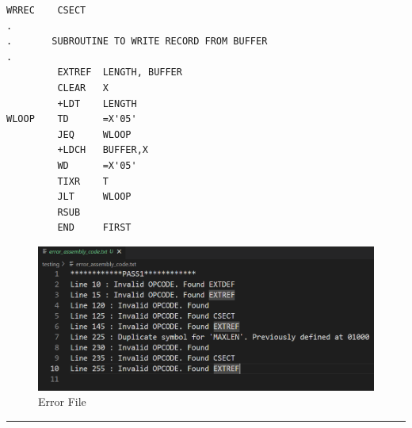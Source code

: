 \documentclass[
]{article}
\begin{document}
\begin{enumerate}
\begin{verbatim}
WRREC    CSECT
.
.       SUBROUTINE TO WRITE RECORD FROM BUFFER
.
         EXTREF  LENGTH, BUFFER
         CLEAR   X            
         +LDT    LENGTH
WLOOP    TD      =X'05'       
         JEQ     WLOOP           
         +LDCH   BUFFER,X        
         WD      =X'05'          
         TIXR    T            
         JLT     WLOOP             
         RSUB
         END     FIRST
\end{verbatim}

\vspace{0.5cm}

\begin{figure}[H]
\centering
\includegraphics{img/image-9.png}
\caption{Error File}
\end{figure}


\end{enumerate}
\vspace{0.7cm}
\rule{\textwidth}{0.1mm}
\end{document}
